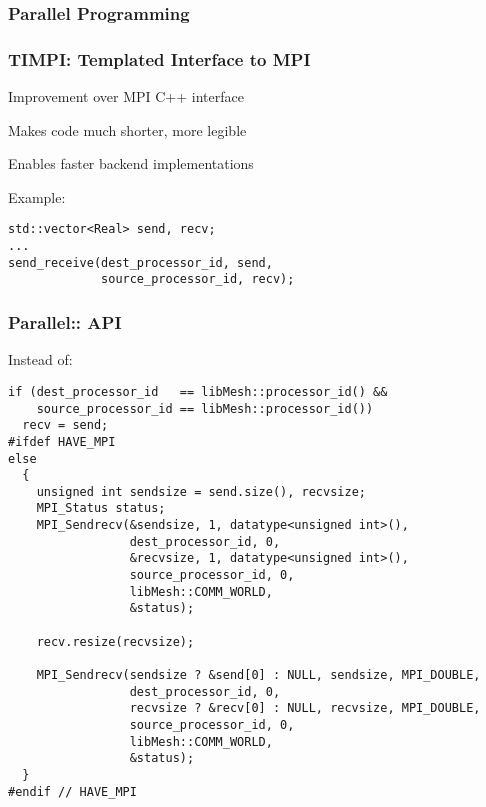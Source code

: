
\subsubsection{Parallel Programming}
\begin{frame}[fragile]
\frametitle{TIMPI: Templated Interface to MPI}
\item Improvement over MPI C++ interface
\item Makes code much shorter, more legible
\item Enables faster backend implementations
\royitemizeend

Example:
\small
\begin{lstlisting}
std::vector<Real> send, recv;
...
send_receive(dest_processor_id, send,
             source_processor_id, recv);
\end{lstlisting}
\end{frame}



\begin{frame}
\frametitle{Parallel:: API}

Instead of:
\begin{lstlisting}
if (dest_processor_id   == libMesh::processor_id() &&
    source_processor_id == libMesh::processor_id())
  recv = send;
#ifdef HAVE_MPI
else
  {
    unsigned int sendsize = send.size(), recvsize;
    MPI_Status status;
    MPI_Sendrecv(&sendsize, 1, datatype<unsigned int>(),
                 dest_processor_id, 0,
                 &recvsize, 1, datatype<unsigned int>(),
                 source_processor_id, 0,
                 libMesh::COMM_WORLD,
                 &status);

    recv.resize(recvsize);

    MPI_Sendrecv(sendsize ? &send[0] : NULL, sendsize, MPI_DOUBLE,
                 dest_processor_id, 0,
                 recvsize ? &recv[0] : NULL, recvsize, MPI_DOUBLE,
                 source_processor_id, 0,
                 libMesh::COMM_WORLD,
                 &status);
  }
#endif // HAVE_MPI
\end{lstlisting}
\end{frame}

